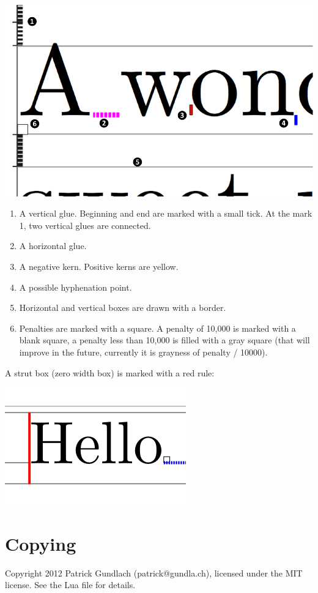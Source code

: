\documentclass{article}
\begin{document}
\noindent\includegraphics[width=.9\textwidth]{lvdebugdetail1-num}
\begin{enumerate}
	\item A vertical glue. Beginning and end are marked with a small tick. At the mark 1, two vertical glues are connected.
\item A horizontal glue.
\item A negative kern. Positive kerns are yellow.
\item A possible hyphenation point.
\item Horizontal and vertical boxes are drawn with a border.
\item Penalties are marked with a square. A penalty of 10,000 is marked with a blank square, a penalty less than 10,000 is filled with a gray square (that will improve in the future, currently it is grayness of penalty / 10000).
\end{enumerate}

A strut box (zero width box) is marked with a red rule:

\noindent\includegraphics[scale=0.8]{strut}



\section{Copying}

Copyright 2012 Patrick Gundlach (patrick@gundla.ch), licensed under the MIT license. See the Lua file for details.
\end{document}
